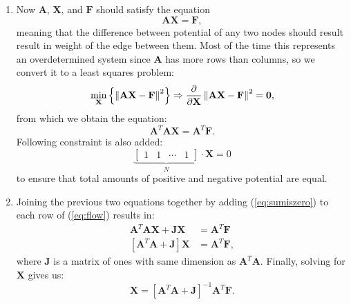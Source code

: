\documentclass[letterpaper, 10 pt, conference]{ieeeconf}
\begin{document}
\begin{enumerate}
    \item Now $\mathbf{A}$, $\mathbf{X}$, and $\mathbf{F}$ should satisfy the equation
    \begin{equation}
      \label{eq:flowover}
      \mathbf{A} \mathbf{X} = \mathbf{F},
    \end{equation}
    meaning that the difference between potential of any two nodes should result result in weight of the edge between them.
    Most of the time this represents an overdetermined system since $\mathbf{A}$ has more rows than columns, so we convert it to a least squares problem:
    \begin{equation}
      \label{eq:flow}
      \begin{gathered}
      \min_{\mathbf{X}} \left\{ \left \lVert \mathbf{A} \mathbf{X} - \mathbf{F}\textsl{} \right \rVert ^ 2 \right\} \Rightarrow
      \frac{\partial}{\partial \mathbf{X}} \left \lVert \mathbf{A} \mathbf{X} - \mathbf{F}\textsl{} \right \rVert ^ 2 = \mathbf{0},
      \end{gathered}
    \end{equation}
    from which we obtain the equation:
    \begin{equation}
      \mathbf{A}^{T} \mathbf{A} \mathbf{X} = \mathbf{A}^{T} \mathbf{F}.
    \end{equation}
    Following constraint is also added:
    \begin{equation}
      \label{eq:sumiszero}
      \underbrace{\begin{bmatrix} 1 & 1 & \cdots & 1 \end{bmatrix}}_{N} \cdot \mathbf{X} = 0
    \end{equation}
    to ensure that total amounts of positive and negative potential are equal.
      
    \item Joining the previous two equations together by adding (\ref{eq:sumiszero}) to each row of (\ref{eq:flow}) results in:
    \begin{equation}
      \begin{aligned}
        \mathbf{A}^{T} \mathbf{A} \mathbf{X} + \mathbf{J} \mathbf{X} &= \mathbf{A}^{T} \mathbf{F}\\
        \left[\mathbf{A}^{T} \mathbf{A} + \mathbf{J} \right] \mathbf{X} &= \mathbf{A}^{T} \mathbf{F},
      \end{aligned}
    \end{equation}
    where $\mathbf{J}$ is a matrix of ones with same dimension as $\mathbf{A}^{T} \mathbf{A}$.
    Finally, solving for $\mathbf{X}$ gives us:
    \begin{equation}
      \mathbf{X} = \left[\mathbf{A}^T \mathbf{A} + \mathbf{J} \right]^{-1} \mathbf{A}^T \mathbf{F}.
    \end{equation}
  \end{enumerate}
      
\end{document}
